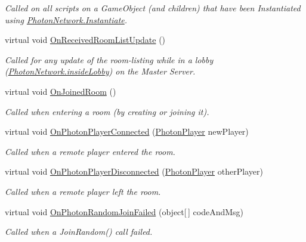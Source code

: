 \begin{DoxyCompactItemize}
\begin{DoxyCompactList}\small\item\em Called on all scripts on a Game\+Object (and children) that have been Instantiated using \hyperlink{class_photon_network_a843d9f62d28ab123c83291c1e6bb857d}{Photon\+Network.\+Instantiate}. \end{DoxyCompactList}\item 
virtual void \hyperlink{class_photon_1_1_pun_behaviour_aa45db114fa51d09929389bf0620f3150}{On\+Received\+Room\+List\+Update} ()
\begin{DoxyCompactList}\small\item\em Called for any update of the room-\/listing while in a lobby (\hyperlink{class_photon_network_a8ad64b1a76c7918bbe5642639afff458}{Photon\+Network.\+inside\+Lobby}) on the Master Server. \end{DoxyCompactList}\item 
virtual void \hyperlink{class_photon_1_1_pun_behaviour_a8ee05dd443b9e51ddf962e655ca8ab77}{On\+Joined\+Room} ()
\begin{DoxyCompactList}\small\item\em Called when entering a room (by creating or joining it). \end{DoxyCompactList}\item 
virtual void \hyperlink{class_photon_1_1_pun_behaviour_abfe94f562c7abc261b25b0df95852a17}{On\+Photon\+Player\+Connected} (\hyperlink{class_photon_player}{Photon\+Player} new\+Player)
\begin{DoxyCompactList}\small\item\em Called when a remote player entered the room. \end{DoxyCompactList}\item 
virtual void \hyperlink{class_photon_1_1_pun_behaviour_af2f8ef712d9942f861f3357bb548e937}{On\+Photon\+Player\+Disconnected} (\hyperlink{class_photon_player}{Photon\+Player} other\+Player)
\begin{DoxyCompactList}\small\item\em Called when a remote player left the room. \end{DoxyCompactList}\item 
virtual void \hyperlink{class_photon_1_1_pun_behaviour_a94f901ce1a7af7b6c49937c5c47ceae4}{On\+Photon\+Random\+Join\+Failed} (object\mbox{[}$\,$\mbox{]} code\+And\+Msg)
\begin{DoxyCompactList}\small\item\em Called when a Join\+Random() call failed. \end{DoxyCompactList}\item 

\end{DoxyCompactItemize}
